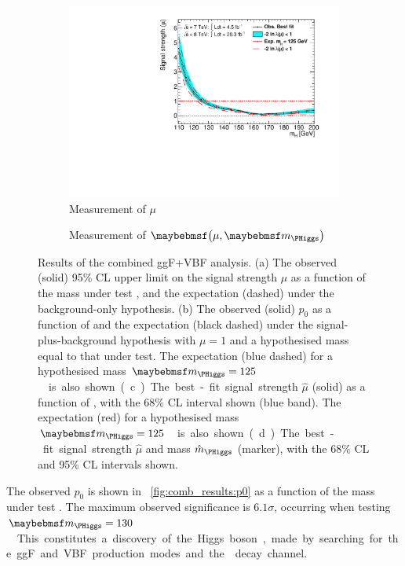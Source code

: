 \begin{figure}[p]
\begin{subfigure}[b]{0.495\textwidth}
		\includegraphics[width=\textwidth,clip=true,trim=0.6cm 0.8cm 1.0cm 0.4cm]{custom_images/limits/mu_combined}
		\caption{Measurement of $\mu$}
		\label{fig:comb_results:mu}
	\end{subfigure}
	\hfill
	\begin{subfigure}[b]{0.495\textwidth}
		\centering
		\caption{Measurement of $\parenths{\mu, \mH}$}
		\label{fig:comb_results:mu_mH}
	\end{subfigure}
	\caption{Results of the combined ggF+VBF analysis. (a) The observed (solid) 95\% CL 
	upper limit on the signal strength $\mu$ as a function of the mass under test \mH, and 
	the expectation (dashed) under the background-only hypothesis. (b) The observed (solid) 
	$p_0$ as a function of \mH and the expectation (black dashed) under the 
	signal-plus-background hypothesis with $\mu = 1$ and a hypothesised mass equal to that 
	under test.	The expectation (blue dashed) for a hypothesised mass 
	\unit{$\mH = 125$}{\GeV} is also shown. (c) The best-fit signal strength $\hat{\mu}$ 
	(solid) as a function of \mH, with the 68\% CL interval shown (blue band). The 
	expectation (red) for a hypothesised mass \unit{$\mH = 125$}{\GeV} is also shown. 
	(d) The best-fit signal strength $\hat{\mu}$ and mass $\hat{m}_{\PHiggs}$ (marker), with 
	the 68\% CL and 95\% CL intervals shown.}
\end{figure}

The observed $p_0$ is shown in \Figure~\ref{fig:comb_results:p0} as a function of the mass 
under test \mH.  The maximum observed significance is $6.1\sigma$, occurring when testing 
\unit{$\mH = 130$}{\GeV}. This constitutes a discovery of the Higgs boson, made by searching 
for the ggF and VBF production modes and the \WW decay channel.

